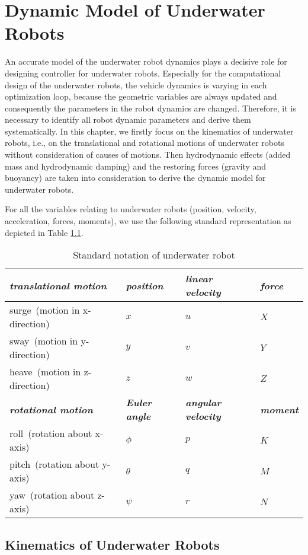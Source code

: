 \chapter{Dynamic Model of Underwater Robots}
\label{Appendix:DM}
An accurate model of the underwater robot dynamics plays a decisive role for designing controller for underwater robots. Especially for the computational design of the underwater robots, the vehicle dynamics is varying in each optimization loop, because the geometric variables are always updated and consequently the parameters in the robot dynamics are changed. Therefore, it is necessary to identify all robot dynamic parameters and derive them systematically. In this chapter, we firstly focus on the kinematics of underwater robots, i.e., on the translational and rotational motions of underwater robots without consideration of causes of motions. Then hydrodynamic effects (added mass and hydrodynamic damping) and the restoring forces (gravity and buoyancy) are taken into consideration to derive the dynamic model for underwater robots.  

For all the variables relating to underwater robots (position, velocity, acceleration, forces, moments), we use the following standard representation as depicted in Table \ref{table:SN}.
\begin{table}[h]
\centering
\caption{Standard notation of underwater robot}
\begin{tabular}{| l | l | l | p{2cm} |}
\hline
\textit{\textbf{translational motion}}&\textit{\textbf{position}}&\textit{\textbf{linear velocity}}&\textit{\textbf{force}} \\ \hline
surge~(motion in x-direction)&$  x$&$  u$&$ X $ \\ \hline
sway~(motion in y-direction)&$  y$&$ v $&$ Y $ \\ \hline
heave~(motion in z-direction)&$  z$&$  w$&$  Z$ \\ \hline
\textit{\textbf{rotational motion}}&\textit{\textbf{Euler angle}}&\textit{\textbf{angular velocity}}&\textit{\textbf{moment}} \\ \hline
roll~(rotation about x-axis)&$ \phi $&$  p$&$ K $ \\ \hline
pitch~(rotation about y-axis)&$ \theta $&$  q$&$ M $ \\ \hline
yaw~(rotation about z-axis)&$ \psi $&$  r$&$ N $ \\ \hline
\end{tabular}
\label{table:SN}
\end{table}   
\section{Kinematics of Underwater Robots}
